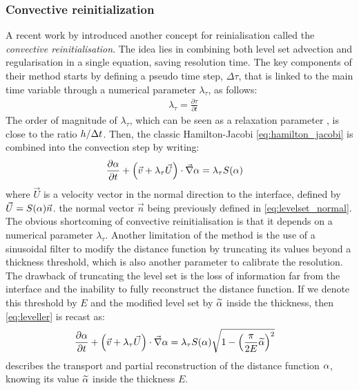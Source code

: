 \subsubsection{Convective reinitialization}
%
A recent work by \citet{ville_convected_2011} introduced another concept for reinialisation 
called the \emph{convective reinitialisation}. The idea lies in combining both level set advection 
and regularisation in a single equation, saving resolution time. The key components of their method
starts by defining a pseudo time step, $\Delta \tau$, that is linked to the main time variable through
a numerical parameter $\lambda_\tau$, as follows:
\begin{align}
\label{eq:pseudotimestep}
& \lambda_\tau = \frac{\partial \tau}{ \partial t}
\end{align}
The order of magnitude of $\lambda_\tau$, which can be seen as a relaxation parameter \citep[see][89]{vigneaux_methodes_2007}, 
is close to the ratio $h/\Delta t$. Then, the classic Hamilton-Jacobi 
\cref{eq:hamilton_jacobi} is combined into the convection step by writing:
\begin{align}
\label{eq:leveller}
& \frac{\partial \alpha}{ \partial t} + \left( \vec{v} + \lambda_\tau \vec{U} \right) \cdot \vec{\nabla} \alpha = \lambda_\tau S(\alpha)
\end{align}
where $\vec{U}$ is a velocity vector in the normal direction to the interface, defined by $\vec{U}= S(\alpha) \vec{n}$.
the normal vector $\vec{n}$ being previously defined in \cref{eq:levelset_normal}.
The obvious shortcoming of convective reinitialisation is that it depends on a numerical parameter $\lambda_\tau$.
Another limitation of the method is the use of a sinusoidal filter to modify the distance function by truncating
its values beyond a thickness threshold, which is also another parameter to calibrate the resolution. The drawback
of truncating the level set is the loss of information far from the interface and the inability to fully reconstruct
the distance function.
If we denote this threshold by $E$ and the modified level set by $\widetilde{\alpha}$ inside the thickness, 
then \cref{eq:leveller} is recast as:
\begin{align}
\label{eq:leveller_s}
& \frac{\partial \alpha}{ \partial t} + \left( \vec{v} + 
\lambda_\tau \vec{U} \right) \cdot \vec{\nabla} \alpha = \lambda_\tau S(\alpha)
\sqrt{1-\left( \frac{\pi}{2 E} \widetilde{\alpha} \right)^2}
\end{align}
 describes the transport and partial reconstruction of the distance function $\alpha$,
knowing its value $\widetilde{\alpha}$ inside the thickness $E$. 
%
